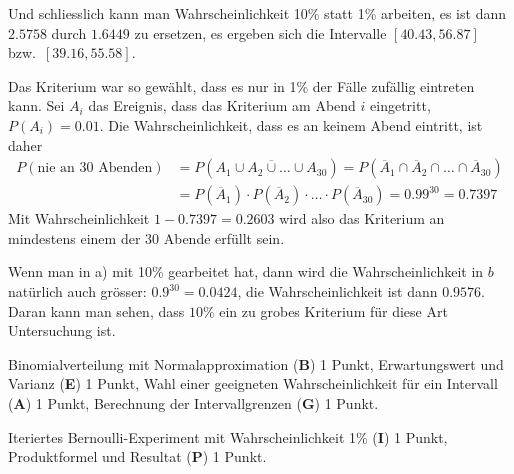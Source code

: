 \begin{loesung}
\begin{teilaufgaben}
Und schliesslich kann man Wahrscheinlichkeit 10\% statt 1\% arbeiten, 
es ist dann $2.5758$ durch $1.6449$ zu ersetzen, es ergeben sich
die Intervalle $[40.43, 56.87]$ bzw.~$[39.16, 55.58]$.
\item
Das Kriterium war so gewählt, dass es nur in 1\% der Fälle zufällig
eintreten kann. Sei $A_i$ das Ereignis, dass das Kriterium am Abend $i$
eingetritt, $P(A_i)=0.01$.
Die Wahrscheinlichkeit, dass es an keinem Abend eintritt,
ist daher 
\begin{align*}
P(\text{nie an 30 Abenden})&=P(\overline{A_1\cup A_2\cup\dots\cup A_{30}})
=P(
\overline{A}_1
\cap
\overline{A}_2
\cap
\dots
\cap
\overline{A}_{30}
)
\\
&=
P(\overline{A}_1)
\cdot
P(\overline{A}_2)
\cdot
\dots
\cdot
P(\overline{A}_{30})
=0.99^{30}=0.7397
\end{align*}
Mit Wahrscheinlichkeit $1-0.7397=0.2603$ wird also das Kriterium an mindestens
einem der 30 Abende erfüllt sein.

Wenn man in a) mit 10\% gearbeitet hat, dann wird die Wahrscheinlichkeit in
$b$ natürlich auch grösser: $0.9^{30}=0.0424$, die Wahrscheinlichkeit ist
dann $0.9576$. Daran kann man sehen, dass $10\%$ ein zu grobes Kriterium
für diese Art Untersuchung ist.
\qedhere
\end{teilaufgaben}
\end{loesung}

\begin{bewertung}
\begin{teilaufgaben}
\item Binomialverteilung mit Normalapproximation ({\bf B}) 1 Punkt,
Erwartungswert und Varianz ({\bf E}) 1 Punkt,
Wahl einer geeigneten Wahrscheinlichkeit für ein Intervall ({\bf A}) 1 Punkt,
Berechnung der Intervallgrenzen ({\bf G}) 1 Punkt.
\item Iteriertes Bernoulli-Experiment mit Wahrscheinlichkeit 1\% ({\bf I})
1 Punkt,
Produktformel und Resultat ({\bf P}) 1 Punkt.
\end{teilaufgaben}
\end{bewertung}


